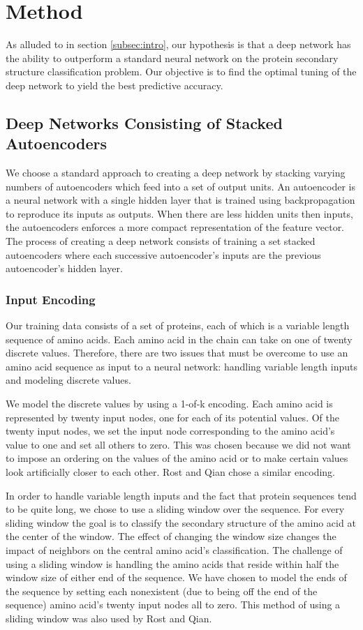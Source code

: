 \documentclass[]{article}
\begin{document}
\section{Method}
As alluded to in section \ref{subsec:intro}, our hypothesis is that a deep network has the ability to outperform a standard neural network on the protein secondary structure classification
problem.
Our objective is to find the optimal tuning of the deep network to yield the best predictive accuracy.

\subsection{Deep Networks Consisting of Stacked Autoencoders}
We choose a standard approach to creating a deep network by stacking varying numbers of autoencoders \cite{Hinton} which feed into a set of output units.
An autoencoder is a neural network with a single hidden layer that is trained using backpropagation to reproduce its inputs as outputs.
When there are less hidden units then inputs, the autoencoders enforces a more compact representation of the feature vector.
The process of creating a deep network consists of training a set stacked autoencoders where each successive autoencoder's inputs are the previous autoencoder's hidden layer.

\subsubsection{Input Encoding}
Our training data consists of a set of proteins, each of which is a variable length sequence of amino acids.
Each amino acid in the chain can take on one of twenty discrete values.
Therefore, there are two issues that must be overcome to use an amino acid sequence as input to a neural network: handling variable length inputs and modeling discrete values.

We model the discrete values by using a 1-of-k encoding.
Each amino acid is represented by twenty input nodes, one for each of its potential values.
Of the twenty input nodes, we set the input node corresponding to the amino acid's value to one and set all others to zero.
This was chosen because we did not want to impose an ordering on the values of the amino acid or to make certain values look artificially closer to each other.
Rost and Qian chose a similar encoding.

In order to handle variable length inputs and the fact that protein sequences tend to be quite long, we chose to use a sliding window over the sequence.
For every sliding window the goal is to classify the secondary structure of the amino acid at the center of the window.
The effect of changing the window size changes the impact of neighbors on the central amino acid's classification.
The challenge of using a sliding window is handling the amino acids that reside within half the window size of either end of the sequence.
We have chosen to model the ends of the sequence by setting each nonexistent (due to being off the end of the sequence) amino acid's twenty input nodes all to zero.
This method of using a sliding window was also used by Rost and Qian.
\end{document}
